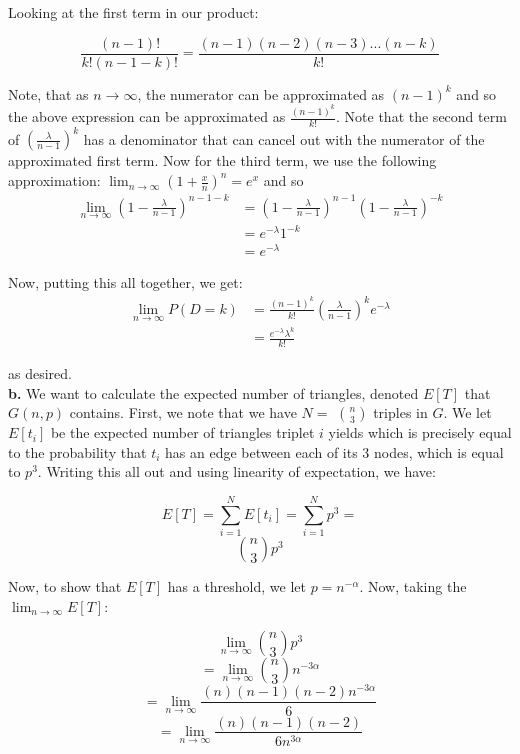 \documentclass[12 pt]{article}
\begin{document}
	\noindent Looking at the first term in our product:
	
	\[\frac{(n - 1)!}{k!(n - 1 - k)!} = \frac{(n-1) (n-2) (n-3) ... (n-k)}{k!}\]
	
	\noindent Note, that as $n \rightarrow \infty$, the numerator can be approximated as $(n-1)^k$ and so the above expression can be approximated as $\frac{(n-1)^k}{k!}$. Note that the second term of $(\frac{\lambda}{n-1})^k$ has a denominator that can cancel out with the numerator of the approximated first term. Now for the third term, we use the following approximation: $\lim_{n \rightarrow \infty}(1 + \frac{x}{n})^n = e^x$ and so
	\begin{equation*}
	\begin{split}
	\lim_{n \rightarrow \infty} (1 - \frac{\lambda}{n - 1})^{n - 1 - k} 
	& = (1 - \frac{\lambda}{n - 1})^{n - 1} (1 - \frac{\lambda}{n - 1})^{-k}\\ 
	& = e^{-\lambda} 1^{-k} \\
	& = e^{-\lambda} 
	\end{split}
	\end{equation*}
	
	\noindent Now, putting this all together, we get: 
	\begin{equation*}
	\begin{split}
	\lim_{n \rightarrow \infty} P(D = k) & = \frac{(n - 1)^k }{k!} (\frac{\lambda}{n - 1})^k e^{-\lambda} \\
	& = \frac{e^{-\lambda} \lambda^k}{k!} 
	\end{split}
	\end{equation*}
	
	\noindent as desired.\\
	
	\noindent \textbf {b.} We want to calculate the expected number of triangles, denoted $E[T]$ that $G(n,p)$ contains. First, we note that we have $N = $ $n \choose 3$ triples in $G$. We let $E[t_i]$ be the expected number of triangles triplet $i$ yields which is precisely equal to the probability that $t_i$ has an edge between each of its 3 nodes, which is equal to $p^3$. Writing this all out and using linearity of expectation, we have: 
	
	\[E[T] = \sum_{i=1}^NE[t_i] = \sum_{i=1}^Np^3 = \]
	\[{n\choose3} p^3 \]
	
	\noindent Now, to show that $E[T]$ has a threshold, we let $p = n^{-\alpha}$. Now, taking the $\lim_{n \rightarrow \infty} E[T]$: 
	
	\[\lim_{n \rightarrow \infty} {n \choose 3} p ^3\]
	\[= \lim_{n \rightarrow \infty} {n \choose 3} n^{-3\alpha}\]
	\[= \lim_{n \rightarrow \infty} \frac{(n)(n-1)(n-2) n^{-3\alpha}}{6}\]
	\[= \lim_{n \rightarrow \infty} \frac{(n)(n-1)(n-2)}{6n^{3\alpha}}\]
	
\end{document}
